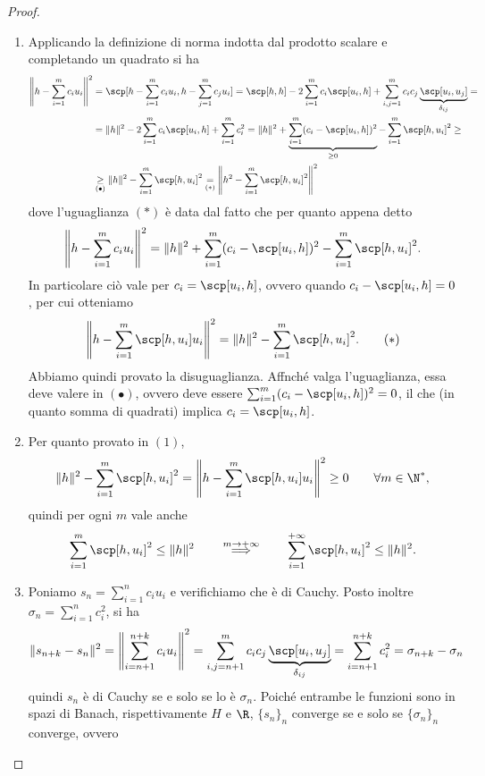 \begin{proof}
    \begin{enumerate}
        \item Applicando la definizione di norma indotta dal prodotto scalare e completando un quadrato si ha
        \begin{align*}
            \left\|h-\sum_{i=1}^m c_iu_i\right\| ^2 &= \scp[h-\sum_{i=1}^m c_iu_i,h-\sum_{j=1}^m c_ju_i] = \scp[h,h]-2\sum_{i=1}^m c_i\scp[u_i,h] + \sum_{i,j=1}^mc_ic_j\underbrace{\scp[u_i,u_j]}_{\delta_{ij}} = \\
            & = \|h\|^2 - 2\sum_{i=1}^m c_i\scp[u_i,h] + \sum_{i=1}^m c_i^2 = 
            \|h\|^2 + \underbrace{\sum_{i=1}^m (c_i - \scp[u_i,h])^2 }_{\geq 0}- \sum_{i=1}^m \scp[h,u_i]^2 \geq\\ & \underset{(\bullet)}{\geq} 
            \|h\|^2 - \sum_{i=1}^m \scp[h,u_i]^2 \underset{(*)}{=} \left\|h^2 - \sum_{i=1}^m \scp[h,u_i]^2\right\|^2
        \end{align*}
        dove l'uguaglianza $(*)$ è data dal fatto che per quanto appena detto \[\left\|h-\sum_{i=1}^m c_iu_i\right\| ^2  = \|h\|^2 + {\sum\limits_{i=1}^m (c_i - \scp[u_i,h])^2 }- \sum_{i=1}^m \scp[h,u_i]^2.\]
        In particolare ciò vale per $c_i = \scp[u_i,h]$, ovvero quando $c_i - \scp[u_i,h] = 0$, per cui otteniamo 
        \[\left\|h-\sum_{i=1}^m \scp[h,u_i]u_i\right\| ^2  = \|h\|^2 - \sum_{i=1}^m \scp[h,u_i]^2.\tag{$*$}\]
        Abbiamo quindi provato la disuguaglianza. Affnché valga l'uguaglianza, essa deve valere in $(\bullet)$, ovvero deve essere $\sum_{i=1}^m (c_i - \scp[u_i,h])^2 = 0$, il che (in quanto somma di quadrati) implica $c_i = \scp[u_i,h]$.
        \item Per quanto provato in $(1)$, 
        \[\|h\|^2 - \sum_{i=1}^m \scp[h,u_i]^2=\left\|h-\sum_{i=1}^m \scp[h,u_i]u_i\right\| ^2 \geq 0\qquad \forall m\in\N^*,\]
        quindi per ogni $m$ vale anche 
        \[\sum_{i=1}^m \scp[h,u_i]^2\leq \|h\|^2\qquad \overset{m\to +\infty}\implies \qquad \sum_{i=1}^{+\infty} \scp[h,u_i]^2\leq \|h\|^2.\]
        \item Poniamo $s_n = \sum_{i=1}^n c_iu_i$ e verifichiamo che è di Cauchy. Posto inoltre $\sigma_n = \sum_{i=1}^n c_i^2$, si ha
        \[\|s_{n+k}-s_n\|^2 = \left\|\sum_{i=n+1}^{n+k}c_iu_i\right\|^2 = \sum_{i,j=n+1}^{m}c_ic_j\underbrace{\scp[u_i,u_j]}_{\delta_{ij}} = \sum_{i=n+1}^{n+k}c_i^2=\sigma_{n+k}-\sigma_n\]
        quindi $s_n$ è di Cauchy se e solo se lo è $\sigma_n$. Poiché entrambe le funzioni sono in spazi di Banach, rispettivamente $H$ e $\R$, $\{s_n\}_{n}$ converge se e solo se $\{\sigma_n\}_{n}$ converge, ovvero

\end{enumerate}
\end{proof}

